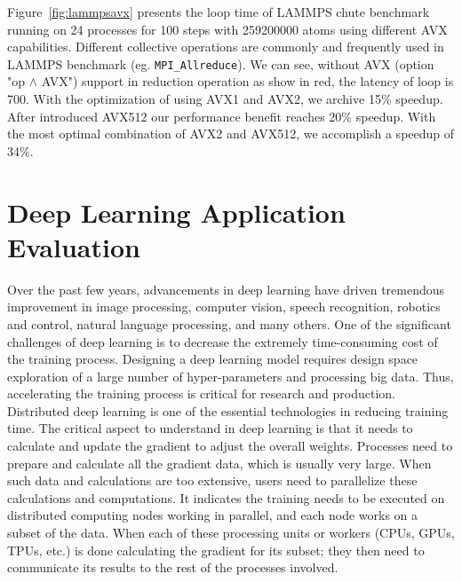 \documentclass[5p,times,twocolumn]{elsarticle}
\newcommand{\mpifunc}[1]{\lstinline"MPI_#1"\xspace}
\begin{document}
Figure~\ref{fig:lammpsavx} presents the loop time of LAMMPS chute benchmark running
on 24 processes for 100 steps with 259200000 atoms using different AVX capabilities.
Different collective operations are commonly and frequently used in LAMMPS benchmark (eg. \mpifunc{Allreduce}).
We can see, without AVX (option "op $\wedge$ AVX") support in reduction operation as show in red, the latency of loop is 700.
With the optimization of using AVX1 and AVX2, we archive 15\% speedup. After introduced AVX512 our performance
benefit reaches 20\% speedup. With the most optimal combination of AVX2 and AVX512,
we accomplish a speedup of 34\%.

\section{Deep Learning Application Evaluation}\label{sec:application}
Over the past few years, advancements in deep learning have driven
tremendous improvement in image processing, computer vision, speech
recognition, robotics and control, natural language processing, and
many others. One of the significant challenges of deep learning is to
decrease the extremely time-consuming cost of the training process.
%
Designing a deep learning model
requires design space exploration of a large number of hyper-parameters and processing big data.
Thus, accelerating the training process is critical for research and production. Distributed deep learning is one of the essential technologies in reducing training time.
%
The critical aspect to understand in deep learning is that it needs to calculate and update
the gradient to adjust the overall weights.
%
Processes need to prepare and calculate all the gradient data, which is usually very large.
When such data and calculations are too extensive, users need to parallelize these calculations and computations.
%
It indicates the training needs to be executed on distributed computing nodes working
in parallel, and each node works on a subset of the data.
%
When each of these processing units or workers (CPUs, GPUs, TPUs, etc.) is done
calculating the gradient for its subset; they then need to communicate its results
to the rest of the processes involved.
\end{document}
